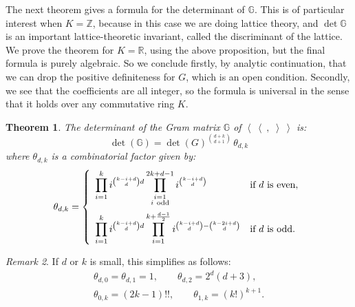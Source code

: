 \documentclass{amsart}
\newcommand{\bra}{\left<\!\!\!\:\left<}
\newcommand{\ket}{\right>\!\!\!\:\right>}
\newcommand{\G}{\mathbb{G}}
\newcommand{\R}{\mathbb{R}}
\newcommand{\Z}{\mathbb{Z}}
\theoremstyle{plain}
\newtheorem{theorem}{Theorem}[section]
\theoremstyle{definition}
\theoremstyle{remark}
\newtheorem{remark}[theorem]{Remark}
\begin{document}
The next theorem gives a formula for the determinant of $\G$. This is of particular interest when $K=\Z$, because in this case we are doing lattice theory, and $\det \G$ is an important lattice-theoretic invariant, called the discriminant of the lattice. We prove the theorem for $K=\R$, using the above proposition, but the final formula is purely algebraic. So we conclude firstly, by analytic continuation, that we can drop the positive definiteness for $G$, which is an open condition. Secondly, we see that the coefficients are all integer, so the formula is universal in the sense that it holds over any commutative ring $K$.
\begin{theorem} \label{maintheorem}
The determinant of the Gram matrix $\G$ of $\bra\ ,\;\ket$ is:
\begin{equation}
\det(\G)= \det(G)^{\binom{d+k}{d+1}}\,\theta_{d,k}
\end{equation}
where $\theta_{d,k}$ is a combinatorial factor given by:
\begin{equation} \label{thetaDef}
\theta_{d,k} = \left\{
 \begin{array}{*2{l}p{5cm}}
 \displaystyle\prod_{i=1}^k i^{\binom{k-i+d}{d}d}\prod_{\substack{i=1 \\ i\ \text{odd}\\\ }}^{2k+d-1}i^{\binom{k-i+d}{d}} &\text{if }d\text{ is even}, \\
 \displaystyle\prod_{i=1}^k i^{\binom{k-i+d}{d}d}\prod_{i=1}^{k+\frac{d-1}{2}} i^{\binom{k-i+d}{d} - \binom{k-2i+d}{d}} &\text{if }d\text{ is odd}.
\end{array}
\right.
\end{equation}
\end{theorem}
\begin{remark} If $d$ or $k$ is small, this simplifies as follows:
\begin{gather*}
\theta_{d,0}=\theta_{d,1} =1,\qquad \theta_{d,2} = 2^{d}(d+3), \\
\theta_{0,k} = (2k-1)!!, \qquad \theta_{1,k} = (k!)^{k+1}.
\end{gather*}
\end{remark}
\end{document}
